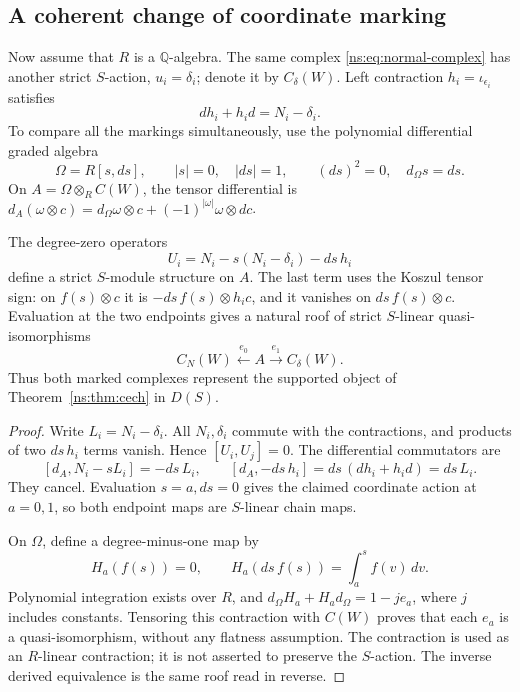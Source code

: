 \subsection{A coherent change of coordinate marking}

Now assume that \(R\) is a \(\mathbb Q\)-algebra.  The same complex
\eqref{ns:eq:normal-complex} has another strict \(S\)-action,
\(u_i=\delta_i\); denote it by \(C_\delta(W)\).
Left contraction \(h_i=\iota_{\epsilon_i}\) satisfies
\begin{equation}\label{ns:eq:marking-homotopy}
 dh_i+h_id=N_i-\delta_i.
\end{equation}
To compare all the markings simultaneously, use the polynomial
differential graded algebra
\[
 \Omega=R[s,ds],\qquad |s|=0,\quad |ds|=1,
 \qquad (ds)^2=0,\quad d_\Omega s=ds.
\]
On \(A=\Omega\otimes_R C(W)\), the tensor differential is
\(d_A(\omega\otimes c)=d_\Omega\omega\otimes c+
(-1)^{|\omega|}\omega\otimes dc\).

\begin{theorem}\label{ns:thm:roof}
The degree-zero operators
\begin{equation}\label{ns:eq:path-marking}
 U_i=N_i-s(N_i-\delta_i)-ds\,h_i
\end{equation}
define a strict \(S\)-module structure on \(A\).
The last term uses the Koszul tensor sign: on \(f(s)\otimes c\)
it is \(-ds\,f(s)\otimes h_ic\), and it vanishes on
\(ds\,f(s)\otimes c\).
Evaluation at the two endpoints gives a natural roof of strict
\(S\)-linear quasi-isomorphisms
\begin{equation}\label{ns:eq:roof}
 C_N(W)\xleftarrow{\ e_0\ }A
             \xrightarrow{\ e_1\ }C_\delta(W).
\end{equation}
Thus both marked complexes represent the supported object of
Theorem~\ref{ns:thm:cech} in \(D(S)\).
\end{theorem}

\begin{proof}
Write \(L_i=N_i-\delta_i\).  All \(N_i,\delta_i\) commute with
the contractions, and products of two \(ds\,h_i\) terms vanish.
Hence \([U_i,U_j]=0\).  The differential commutators are
\[
 [d_A,N_i-sL_i]=-ds\,L_i,\qquad
 [d_A,-ds\,h_i]=ds\,(dh_i+h_id)=ds\,L_i.
\]
They cancel.  Evaluation \(s=a,ds=0\) gives the claimed coordinate
action at \(a=0,1\), so both endpoint maps are \(S\)-linear chain maps.

On \(\Omega\), define a degree-minus-one map by
\[
 H_a(f(s))=0,\qquad
 H_a(ds\,f(s))=\int_a^s f(v)\,dv.
\]
Polynomial integration exists over \(R\), and
\(d_\Omega H_a+H_ad_\Omega=1-j e_a\), where \(j\) includes
constants.  Tensoring this contraction with \(C(W)\) proves that
each \(e_a\) is a quasi-isomorphism, without any flatness assumption.
The contraction is used as an \(R\)-linear contraction; it is not
asserted to preserve the \(S\)-action.
The inverse derived equivalence is the same roof read in reverse.
\end{proof}

